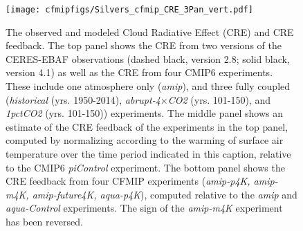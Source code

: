 \documentclass[draft]{agujournal2019}
\begin{document}

\begin{figure}
  \centering
  \texttt{[image: cfmipfigs/Silvers\_cfmip\_CRE\_3Pan\_vert.pdf]}
  \caption{The observed and modeled Cloud Radiative Effect (CRE) and CRE feedback.  The top panel 
  shows the CRE from two versions of the CERES-EBAF observations (dashed black, version 2.8; solid black, version 4.1) as well as the CRE from four CMIP6 experiments.  These include one atmosphere only (\textit{amip}), and three fully coupled (\textit{historical} (yrs. 1950-2014), \textit{abrupt-4$\times$CO2} (yrs. 101-150), and \textit{1pctCO2} (yrs. 101-150)) experiments.  
  The middle panel shows an estimate of the CRE feedback of the experiments in the top panel, computed by normalizing according to the     
  warming of surface air temperature over the time period indicated in this caption, relative to the CMIP6 \textit{piControl} experiment.  
  The bottom panel shows the CRE feedback from four CFMIP experiments (\textit{amip-p4K, amip-m4K, amip-future4K, aqua-p4K}), computed relative to the \textit{amip} and \textit{aqua-Control} experiments.  The sign of the \textit{amip-m4K} experiment has been reversed.}
  \label{fig:CRE_feedback}
\end{figure}    
\end{document}
